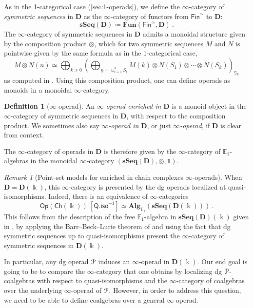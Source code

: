 \documentclass{proc-l}
\renewcommand{\mathcal}{\EuScript}
\theoremstyle{plain}
\theoremstyle{definition}
\newtheorem{definition}[{theorem}]{Definition}
\theoremstyle{remark}
\newtheorem{remark}[{theorem}]{Remark}
\newcommand{\kk}{\Bbbk}
\begin{document}
As in the 1-categorical case (\cref{sec:1-operads}), we define the $\infty$-category of \textit{symmetric sequences} in $\mathbf{D}$ as the $\infty$-category of functors from $\mathsf{Fin}^{\simeq}$ to $\mathbf{D}$:
\[
\mathbf{sSeq}(\mathbf{D}) \coloneqq \mathbf{Fun}(\mathsf{Fin}^{\simeq},\mathbf{D})~.
\]
The $\infty$-category of symmetric sequences in $\mathbf{D}$ admits a monoidal structure given by the composition product $\circledcirc$, which for two symmetric sequences $M$ and $N$ is pointwise given by the same formula as in the 1-categorical case,
\[
M \circledcirc N(n) \simeq \bigoplus_{k \geq 0} \left(\bigoplus_{\underline{n} = \sqcup_{i=1}^k S_i} M(k) \otimes N(S_1) \otimes \cdots \otimes N(S_k)\right)_{\mathbb{S}_k}
\]
as computed in \cite[Appendix A.1.]{ShiPhD}. Using this composition product, one can define operads as monoids in a monoidal $\infty$-category.

\begin{definition}[{$\infty$-operad}]%
\label{Definition:3.1}
An \emph{$\infty$-operad enriched in $\mathbf D$}  is  a monoid object in the $\infty$-category of symmetric sequences in $\mathbf D$, with respect to the composition product. We sometimes also say \emph{$\infty$-operad in $\mathbf D$}, or just \emph{$\infty$-operad}, if $\mathbf D$ is clear from context.
\end{definition}

The $\infty$-category of operads in $\mathbf{D}$ is therefore given by the $\infty$-category of $\mathbb{E}_1$-algebras in  the monoidal $\infty$-category $(\mathbf{sSeq}(\mathbf{D}),\circledcirc, \mathbb{1})$.

\begin{remark}[{Point-set models for enriched in chain complexes $\infty$-operads}]%
\label{Remark:3.2}
When $\mathbf D = \mathbf D(\kk)$, this $\infty$-category is presented by the dg operads localized at quasi-isomorphisms. Indeed, there is an equivalence of $\infty$-categories
\[
\mathsf{Op}(\mathsf{Ch}(\kk))~[\mathsf{Q.iso}^{-1}] \simeq \mathbf{Alg}_{\mathbb{E}_1}(\mathbf{sSeq}(\mathbf{D}(\kk)))~.
\]
This follows from the description of the free $\mathbb{E}_1$-algebra in $\mathbf{sSeq}(\mathbf{D})(\kk)$ given in \cite[Theorem B.2]{pdalgebras}, by applying the Barr--Beck--Lurie theorem of \cite[Theorem 4.7.3.5]{HigherAlgebra} and using the fact that dg symmetric sequences up to quasi-isomorphisms present the $\infty$-category of symmetric sequences in $\mathbf{D}(\kk)$.

In particular, any dg operad $\mathcal{P}$ induces an $\infty$-operad in $\mathbf{D}(\kk)$. Our end goal is going to be to compare the $\infty$-category that one obtains by localizing dg $\mathcal{P}$-coalgebras with respect to quasi-isomorphisms and the $\infty$-category of coalgebras over the underlying $\infty$-operad of $\mathcal{P}$. However, in order to address this question, we need to be able to define coalgebras over a general $\infty$-operad.
\end{remark}
\end{document}

